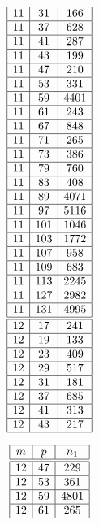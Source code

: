\documentclass[a4paper, 10pt]{article}
\begin{document}
\begin{center}
\begin{minipage}[t]{.23\textwidth}
\begin{displaymath}
\begin{array}{|c|c|c|}
11 & 31 & 166 \\ \hline
11 & 37 & 628 \\ \hline
11 & 41 & 287 \\ \hline
11 & 43 & 199 \\ \hline
11 & 47 & 210 \\ \hline
11 & 53 & 331 \\ \hline
11 & 59 & 4401 \\ \hline
11 & 61 & 243 \\ \hline
11 & 67 & 848 \\ \hline
11 & 71 & 265 \\ \hline
11 & 73 & 386 \\ \hline
11 & 79 & 760 \\ \hline
11 & 83 & 408 \\ \hline
11 & 89 & 4071 \\ \hline
11 & 97 & 5116 \\ \hline
11 & 101 & 1046 \\ \hline
11 & 103 & 1772 \\ \hline
11 & 107 & 958 \\ \hline
11 & 109 & 683 \\ \hline
11 & 113 & 2245 \\ \hline
11 & 127 & 2982 \\ \hline
11 & 131 & 4995 \\ \hline
\hline
12 & 17 & 241 \\ \hline
12 & 19 & 133 \\ \hline
12 & 23 & 409 \\ \hline
12 & 29 & 517 \\ \hline
12 & 31 & 181 \\ \hline
12 & 37 & 685 \\ \hline
12 & 41 & 313 \\ \hline
12 & 43 & 217 \\ \hline
\end{array}
\end{displaymath}
\end{minipage}
\begin{minipage}[t]{.23\textwidth}
\begin{displaymath}
\begin{array}{|c|c|c|}
\hline
m & p & n_{1} \\ \hline
\hline
12 & 47 & 229 \\ \hline
12 & 53 & 361 \\ \hline
12 & 59 & 4801 \\ \hline
12 & 61 & 265 \\ \hline

\end{array}
\end{displaymath}
\end{minipage}
\end{center}
\end{document}
